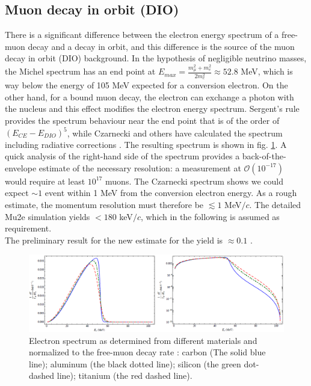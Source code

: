 \documentclass[12pt,a4paper,openright, oneside, titlepage]{book} %
\begin{document}
\subsection{Muon decay in orbit (DIO)}
There is a significant difference between the electron energy spectrum of a free-muon decay and a decay in orbit, and this difference is the source of the muon decay in orbit (DIO) background.
In the hypothesis of negligible neutrino masses, the Michel spectrum has an end point at $E_{max}=\frac{m_\mu^2+m_e^2}{2m_e^2}\approx52.8$ MeV, which is way below the energy of 105 MeV expected for a conversion electron.
On the other hand, for a bound muon decay, the electron can exchange a photon with the nucleus and this effect modifies the electron energy spectrum. 
Sergent's rule provides the spectrum behaviour near the end point that is of the order of $(E_{CE}-E_{DIO})^5$, while Czarnecki and others have calculated the spectrum including radiative corrections \cite{Czarnecki} \cite{Czarnecki2015}.
The resulting spectrum is shown in fig. \ref{_DIO}.
A quick analysis of the right-hand side of the spectrum provides a back-of-the-envelope estimate of the necessary resolution: a measurement at $\mathcal{O}(10^{-17})$ would require at least $10^{17}$ muons. 
The Czarnecki spectrum shows we could expect $\sim1$ event within 1 MeV from the conversion electron energy. 
As a rough estimate, the momentum resolution must therefore be $\lesssim1$ MeV$/c$. 
The detailed Mu2e simulation yields $<180$ keV$/c$, which in the following is assumed as requirement. \\
The preliminary result for the new estimate for the yield is $\approx0.1$ \cite{DIO_now}.\\

\begin{figure}[h!]
\centering
\includegraphics[scale=0.8]{DIO_materials}
\caption[Decay In Orbit spectra]{Electron spectrum as determined from different materials and normalized to the free-muon decay rate \cite{Signorelli}: carbon (The solid blue line); aluminum (the black dotted line); silicon (the green dot-dashed line); titanium (the red dashed line).}
\label{_DIO}
\end{figure}
\end{document}
